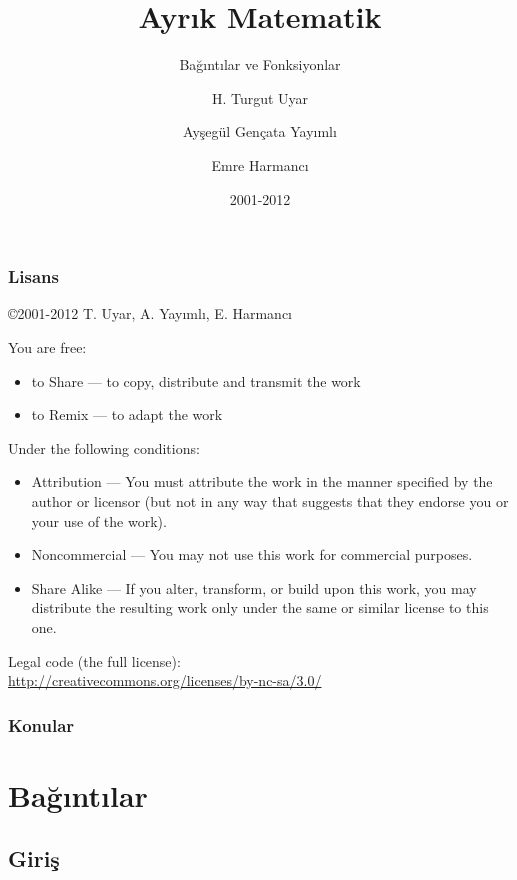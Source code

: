 \documentclass[dvipsnames]{beamer}
\title{Ayrık Matematik}
\subtitle{Bağıntılar ve Fonksiyonlar}
\author{H. Turgut Uyar \and Ayşegül Gençata Yayımlı \and Emre Harmancı}
\date{2001-2012}
\theoremstyle{definition}
\theoremstyle{example}
\theoremstyle{plain}
\begin{document}
\begin{frame}
  \titlepage
\end{frame}

\begin{frame}
  \frametitle{Lisans}

  \hfill
  \copyright 2001-2012 T. Uyar, A. Yayımlı, E. Harmancı

  \vfill
  \begin{tiny}
    You are free:
    \begin{itemize}
      \item to Share — to copy, distribute and transmit the work
      \item to Remix — to adapt the work
    \end{itemize}

    Under the following conditions:
    \begin{itemize}
      \item Attribution — You must attribute the work in the manner specified by
        the author or licensor (but not in any way that suggests that they
        endorse you or your use of the work).

      \item Noncommercial — You may not use this work for commercial purposes.

      \item Share Alike — If you alter, transform, or build upon this work, you
        may distribute the resulting work only under the same or similar license
        to this one.
    \end{itemize}
  \end{tiny}

  \vfill
  Legal code (the full license):\\
  \url{http://creativecommons.org/licenses/by-nc-sa/3.0/}
\end{frame}

\begin{frame}
  \frametitle{Konular}
  \tableofcontents
\end{frame}

\section{Bağıntılar}

\subsection{Giriş}
\end{document}
